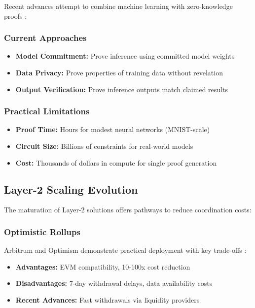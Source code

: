 Recent advances attempt to combine machine learning with zero-knowledge proofs \citep{kang2023zkml}:

\subsubsection{Current Approaches}
\begin{itemize}
    \item \textbf{Model Commitment:} Prove inference using committed model weights
    \item \textbf{Data Privacy:} Prove properties of training data without revelation
    \item \textbf{Output Verification:} Prove inference outputs match claimed results
\end{itemize}

\subsubsection{Practical Limitations}
\begin{itemize}
    \item \textbf{Proof Time:} Hours for modest neural networks (MNIST-scale)
    \item \textbf{Circuit Size:} Billions of constraints for real-world models
    \item \textbf{Cost:} Thousands of dollars in compute for single proof generation
\end{itemize}

\subsection{Layer-2 Scaling Evolution}

The maturation of Layer-2 solutions offers pathways to reduce coordination costs:

\subsubsection{Optimistic Rollups}
Arbitrum and Optimism demonstrate practical deployment with key trade-offs \citep{kalodner2023arbitrum}:
\begin{itemize}
    \item \textbf{Advantages:} EVM compatibility, 10-100x cost reduction
    \item \textbf{Disadvantages:} 7-day withdrawal delays, data availability costs
    \item \textbf{Recent Advances:} Fast withdrawals via liquidity providers
\end{itemize}

